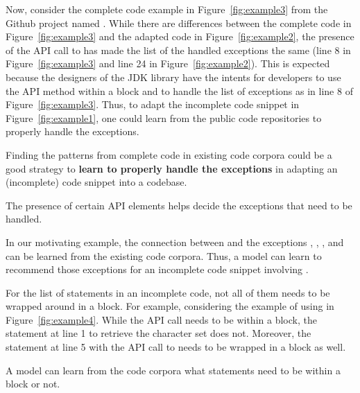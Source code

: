 

Now, consider the complete code example in Figure~\ref{fig:example3}
from the Github project named . While there are
differences between the complete code in Figure~\ref{fig:example3} and
the adapted code in Figure~\ref{fig:example2}, the presence of the API
call to  has made the list of the handled
exceptions the same (line 8 in Figure~\ref{fig:example3} and line 24
in Figure~\ref{fig:example2}). This is expected because the designers
of the JDK library have the intents for developers to use the API
method  within a  block and
to handle the list of exceptions as in line 8 of
Figure~\ref{fig:example3}. Thus, to adapt the incomplete code snippet
in Figure~\ref{fig:example1}, one could learn from the public code
repositories to properly handle the exceptions.

\begin{Observation} 
Finding the patterns from complete code in existing code corpora could
be a good strategy to {\bf learn to properly handle the exceptions} in
adapting an (incomplete) code snippet into a codebase.
\end{Observation}

\begin{Observation} 
The presence of certain API elements helps decide the exceptions that
need to be handled.
\end{Observation}

In our motivating example, the connection between
 and the exceptions
, ,
, and
 can be learned from the existing
code corpora. Thus, a model can learn to recommend those exceptions
for an incomplete code snippet involving .



For the list of statements in an incomplete code, not all of them
needs to be wrapped around in a  block. For example,
considering the example of using  in
Figure~\ref{fig:example4}. While the API call
 needs to be within a
 block, the statement at line 1 to retrieve the
character set does not. Moreover, the statement at line 5 with the API
call to  needs to be wrapped in a 
block as well.

\begin{Observation} 
  A model can learn from the code corpora what statements need to be
  within a  block or not.
\end{Observation}
